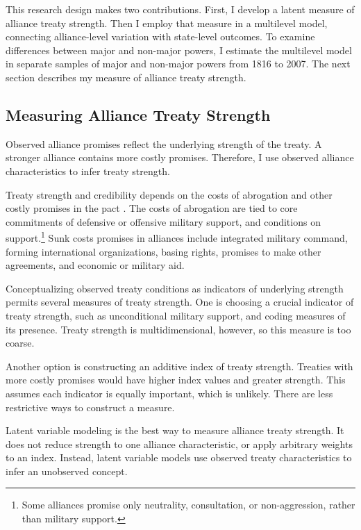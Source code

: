 \documentclass[12pt]{article}
\begin{document}
This research design makes two contributions. 
First, I develop a latent measure of alliance treaty strength. 
Then I employ that measure in a multilevel model, connecting alliance-level variation with state-level outcomes. 
To examine differences between major and non-major powers, I estimate the multilevel model in separate samples of major and non-major powers from 1816 to 2007. 
The next section describes my measure of alliance treaty strength. 


\subsection{Measuring Alliance Treaty Strength} 

Observed alliance promises reflect the underlying strength of the treaty. 
A stronger alliance contains more costly promises. 
Therefore, I use observed alliance characteristics to infer treaty strength.


Treaty strength and credibility depends on the costs of abrogation and other costly promises in the pact \citep{Leeds2003}. 
The costs of abrogation are tied to core commitments of defensive or offensive military support, and conditions on support.\footnote{Some alliances promise only neutrality, consultation, or non-aggression, rather than military support.}  
Sunk costs promises in alliances include integrated military command, forming international organizations, basing rights, promises to make other agreements, and economic or military aid. 


Conceptualizing observed treaty conditions as indicators of underlying strength permits several measures of treaty strength. 
One is choosing a crucial indicator of treaty strength, such as unconditional military support, and coding measures of its presence. 
Treaty strength is multidimensional, however, so this measure is too coarse. 


Another option is constructing an additive index of treaty strength. 
Treaties with more costly promises would have higher index values and greater strength. 
This assumes each indicator is equally important, which is unlikely. 
There are less restrictive ways to construct a measure. 


Latent variable modeling is the best way to measure alliance treaty strength. 
It does not reduce strength to one alliance characteristic, or apply arbitrary weights to an index. 
Instead, latent variable models use observed treaty characteristics to infer an unobserved concept. 
\end{document}
